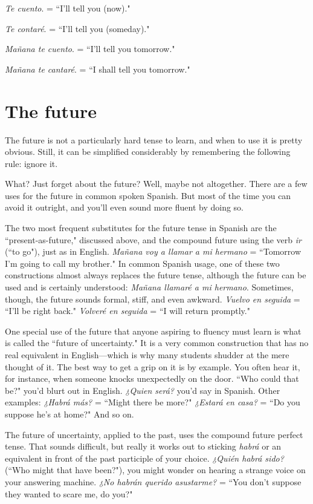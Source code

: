 \bsk

\indu \emph{Te cuento}. = ``I'll tell you (now)."

\indu \emph{Te contaré}. = ``I'll tell you (someday)."

\indu \emph{Mañana te cuento}. = ``I'll tell you tomorrow."

\indu \emph{Mañana te cantaré}. = ``I shall tell you tomorrow."

\section{The future}

The future is not a particularly hard tense to learn, and when
to use it is pretty obvious. Still, it can be simplified considerably by
remembering the following rule: ignore it.

What? Just forget about the future? Well, maybe not altogether. There are a few uses for the future in common spoken Spanish.
But most of the time you can avoid it outright, and you'll even sound
more fluent by doing so.

The two most frequent substitutes for the future tense in
Spanish are the ``present-as-future," discussed above, and the compound future using the verb \emph{ir} (``to go"), just as in English. \emph{Mañana voy
	a llamar a mi hermano} = ``Tomorrow I'm going to call my brother."
In common Spanish usage, one of these two constructions almost always replaces the future tense, although the future can be used and is
certainly understood: \emph{Mañana llamaré a mi hermano}. Sometimes,
though, the future sounds formal, stiff, and even awkward. \emph{Vuelvo en
	seguida} = ``I'll be right back." \emph{Volveré en seguida} = ``I will return
promptly."

One special use of the future that anyone aspiring to fluency
must learn is what is called the ``future of uncertainty." It is a very
common construction that has no real equivalent in English---which is
why many students shudder at the mere thought of it. The best way to
get a grip on it is by example. You often hear it, for instance, when
someone knocks unexpectedly on the door. ``Who could that be?"
you'd blurt out in English. \emph{¿Quien será?} you'd say in Spanish. Other
examples: \emph{¿Habrá más?} = ``Might there be more?" \emph{¿Estará en casa?} =
``Do you suppose he's at home?" And so on.

The future of uncertainty, applied to the past, uses the compound future perfect tense. That sounds difficult, but really it works
out to sticking \emph{habrá} or an equivalent in front of the past participle of
your choice. \emph{¿Quién habrá sido?} (``Who might that have been?"), you
might wonder on hearing a strange voice on your answering machine.
\emph{¿No habrán querido asustarme?} = ``You don't suppose they wanted to
scare me, do you?"

